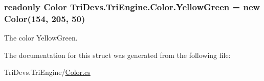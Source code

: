 \hypertarget{struct_tri_devs_1_1_tri_engine_1_1_color_a23a4b1ffdac1f629bc4f0789db106ebc}{
\subsubsection[{Yellow\-Green}]{\setlength{\rightskip}{0pt plus 5cm}readonly {\bf Color} Tri\-Devs.\-Tri\-Engine.\-Color.\-Yellow\-Green = new {\bf Color}(154, 205, 50)\hspace{0.3cm}{\ttfamily [static]}}}\label{struct_tri_devs_1_1_tri_engine_1_1_color_a23a4b1ffdac1f629bc4f0789db106ebc}


The color Yellow\-Green. 



The documentation for this struct was generated from the following file\-:\begin{DoxyCompactItemize}
\item 
Tri\-Devs.\-Tri\-Engine/\hyperlink{_color_8cs}{Color.\-cs}\end{DoxyCompactItemize}
